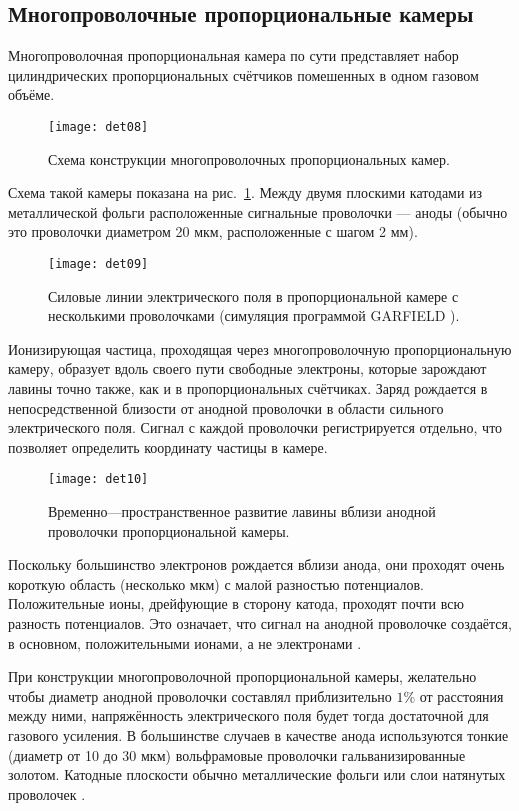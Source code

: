 \subsection{Многопроволочные пропорциональные камеры}
Многопроволочная пропорциональная камера по сути представляет
набор цилиндрических пропорциональных счётчиков помешенных в одном
газовом объёме.
\begin{figure}[h]\center
  \texttt{[image: det08]}
  \caption{Схема конструкции многопроволочных пропорциональных камер.}
  \label{fig:det08}
\end{figure}
Схема такой камеры показана на рис.~\ref{fig:det08}. Между двумя
плоскими катодами из металлической фольги расположенные сигнальные
проволочки --- аноды (обычно это проволочки диаметром 20 мкм,
расположенные с шагом 2 мм).
\begin{figure}[h]\center
  \texttt{[image: det09]}
  \caption{Силовые линии электрического поля в пропорциональной камере
    с несколькими проволочками (симуляция программой GARFIELD \cite{gar}).}
  \label{fig:det09}
\end{figure}

Ионизирующая частица, проходящая через многопроволочную
пропорциональную камеру, образует вдоль своего пути свободные электроны,
которые зарождают лавины точно также, как и в пропорциональных счётчиках.
Заряд рождается в непосредственной близости от анодной проволочки
в области сильного электрического поля. Сигнал с каждой проволочки
регистрируется отдельно, что позволяет определить координату частицы
в камере.
\begin{figure}[h]\center
  \texttt{[image: det10]}
  \caption{Временно---пространственное развитие лавины вблизи анодной
    проволочки пропорциональной камеры.}
  \label{fig:det10}
\end{figure}

Поскольку большинство электронов рождается вблизи анода, они
проходят очень короткую область (несколько мкм) с малой разностью
потенциалов. Положительные ионы, дрейфующие в сторону катода, проходят
почти всю разность потенциалов. Это означает, что сигнал на анодной
проволочке создаётся, в основном, положительными ионами, а не
электронами \cite{pes:86}.

При конструкции многопроволочной пропорциональной камеры, желательно
чтобы диаметр анодной проволочки составлял приблизительно $1\%$ от
расстояния между ними, напряжённость электрического поля будет тогда
достаточной для газового усиления. В большинстве случаев в качестве анода
используются тонкие (диаметр от 10 до 30 мкм) вольфрамовые проволочки
гальванизированные золотом. Катодные плоскости обычно металлические
фольги или слои натянутых проволочек \cite{gru:99}.

